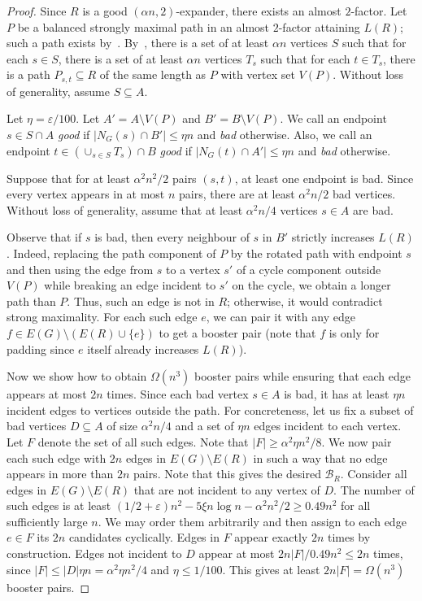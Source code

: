 \documentclass[reqno,final,a4paper]{amsart}
\numberwithin{equation}{section}
\theoremstyle{definition}
\theoremstyle{remark}
\newcommand{\eps}{\varepsilon}
\def\calB{\mathcal{B}}
\begin{document}
\begin{proof}
    Since $R$ is a good $(\alpha n,2)$-expander, there exists an almost $2$-factor. Let $P$ be a balanced strongly maximal path in an almost $2$-factor attaining $L(R)$; such a path exists by~. 
    By~, there is a set of at least $\alpha n$ vertices $S$ such that for each $s\in S$, there is a set of at least $\alpha n$ vertices $T_s$ such that for each $t\in T_s$, there is a path $P_{s,t}\subseteq R$ of the same length as $P$ with vertex set $V(P)$. 
    Without loss of generality, assume $S\subseteq A$.

    Let $\eta = \eps/100$. 
    Let $A' = A\setminus V(P)$ and $B' = B\setminus V(P)$. 
    We call an endpoint $s\in S\cap A$ \emph{good} if $|N_{G}(s)\cap B'|\leq \eta n$ and \emph{bad} otherwise. Also, we call an endpoint $t\in (\cup_{s\in S}T_s)\cap B$ \emph{good} if $|N_{G}(t)\cap A'|\leq \eta n$ and \emph{bad} otherwise.

    Suppose that for at least $\alpha^2n^2/2$ pairs $(s,t)$, at least one endpoint is bad. Since every vertex appears in at most $n$ pairs, there are at least $\alpha^2 n/2$ bad vertices.
    Without loss of generality, assume that at least $\alpha^2 n/4$ vertices $s\in A$ are bad.
    
    Observe that if $s$ is bad, then every neighbour of $s$ in $B'$ strictly increases $L(R)$. 
    Indeed, replacing the path component of $P$ by the rotated path with endpoint $s$ and then using the edge from $s$ to a vertex $s'$ of a cycle component outside $V(P)$ while breaking an edge incident to $s'$ on the cycle, we obtain a longer path than $P$.
    Thus, such an edge is not in $R$; otherwise, it would contradict strong maximality.
    For each such edge $e$, we can pair it with any edge $f\in E(G)\setminus (E(R)\cup \{e\})$ to get a booster pair (note that $f$ is only for padding since $e$ itself already increases $L(R)$).
    
    Now we show how to obtain $\Omega(n^3)$ booster pairs while ensuring that each edge appears at most $2n$ times. 
    Since each bad vertex $s\in A$ is bad, it has at least $\eta n$ incident edges to vertices outside the path. 
    For concreteness, let us fix a subset of bad vertices $D\subseteq A$ of size $\alpha^2 n/4$ and a set of $\eta n$ edges incident to each vertex.
    Let $F$ denote the set of all such edges. Note that $|F|\geq \alpha^2 \eta n^2/8$.
    We now pair each such edge with $2n$ edges in $E(G)\setminus E(R)$ in such a way that no edge appears in more than $2n$ pairs. 
    Note that this gives the desired $\calB_R$.
    Consider all edges in $E(G)\setminus E(R)$ that are not incident to any vertex of $D$. The number of such edges is at least $(1/2+\eps )n^2 - 5\xi n\log n - \alpha^2 n^2/2 \geq 0.49n^2$ for all sufficiently large $n$. We may order them arbitrarily and then assign to each edge $e\in F$ its $2n$ candidates cyclically.
    Edges in $F$ appear exactly $2n$ times by construction. Edges not incident to $D$ appear at most $2n|F|/0.49n^2 \leq 2n$ 
    times, since $|F|\leq |D|\eta n = \alpha^2\eta n^2/4$ and $\eta\leq 1/100$. This gives at least $2n|F|= \Omega(n^3)$ booster pairs.


\end{proof}
\end{document}
